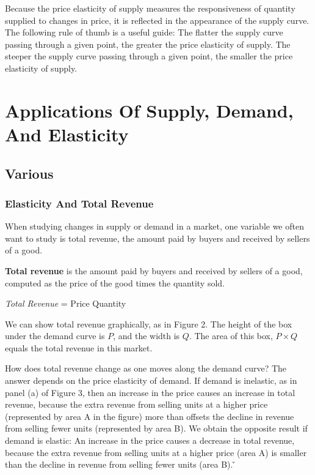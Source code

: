
Because the price elasticity of supply measures the responsiveness of quantity supplied to changes in price, it is
reflected in the appearance of the supply curve. The following rule of thumb is a useful guide: The flatter the
supply curve passing through a given point, the greater the price elasticity of supply. The steeper the supply curve
passing through a given point, the smaller the price elasticity of supply.

\section{Applications Of Supply, Demand, And Elasticity}

\subsection{Various}

\subsubsection*{Elasticity And Total Revenue}

When studying changes in supply or demand in a market, one variable we often want to study is total revenue, the
amount paid by buyers and received by sellers of a good.

\textbf{Total revenue} is the amount paid by buyers and received by sellers of a good, computed as the price of the good
times the quantity sold.

\bse
\textit{Total Revenue} = Price \times Quantity
\ese
\ed

We can show total revenue graphically, as in Figure 2. The height of the box under the demand curve is $P$, and the
width is $Q$. The area of this box, $P \times Q$ equals the total revenue in this market.


How does total revenue change as one moves along the demand curve? The answer depends on the price elasticity of
demand. If demand is inelastic, as in panel (a) of Figure 3, then an increase in the price causes an increase in
total revenue, because the extra revenue from selling units at a higher price (represented by area A in the figure)
more than offsets the decline in revenue from selling fewer units (represented by area B). We obtain the opposite
result if demand is elastic: An increase in the price causes a decrease in total revenue, because the extra revenue
from selling units at a higher price (area A) is smaller than the decline in revenue from selling fewer units (area
B). \v

